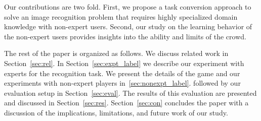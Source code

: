 Our contributions are two fold. First, we propose a task conversion
approach to solve an image recognition problem that requires highly
specialized domain knowledge with non-expert users. Second, our study
on the learning behavior of the non-expert users provides insights
into the ability and limits of the crowd.  

The rest of the paper is organized as follows. 
We discuss related work in Section~\ref{sec:rel}. 
In Section~\ref{sec:expt_label} we describe our experiment with
experts for the recognition task. We present the details of the game
and our experiments with non-expert players
in~\ref{sec:nonexpt_label}. followed by our evaluation setup in
Section~\ref{sec:eval}. The results of this evaluation are presented
and discussed in Section~\ref{sec:res}. Section~\ref{sec:con}
concludes the paper with a discussion of the implications,
limitations, and future work of our study. 
\fi

%
%
%
%
%
%

%
